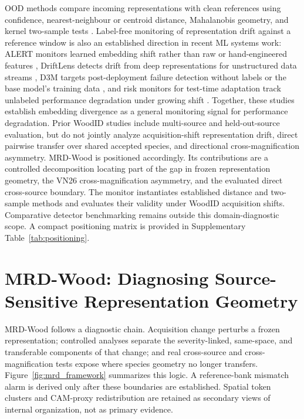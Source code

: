 \documentclass[a4paper,fleqn]{els-cas-templates/cas-sc}
\begin{document}
OOD methods compare incoming representations with clean references using
confidence, nearest-neighbour or centroid distance, Mahalanobis geometry, and
kernel two-sample tests
\citep{hendrycks2017baseline,lee2018mahalanobis,sun2022knn,gretton2012mmd}.
Label-free monitoring of representation drift against a reference window is
also an established direction in recent ML systems work: ALERT monitors learned
embedding shift rather than raw or hand-engineered features
\citep{tziouvaras2025alert}, DriftLens detects drift from deep representations
for unstructured data streams \citep{greco2024driftlens}, D3M targets
post-deployment failure detection without labels or the base model's training
data \citep{nguyen2025d3m}, and risk monitors for test-time adaptation track
unlabeled performance degradation under growing shift
\citep{schirmer2025monitoring}. Together, these studies establish embedding
divergence as a general monitoring signal for performance degradation.
Prior WoodID studies include multi-source and held-out-source evaluation, but do
not jointly analyze acquisition-shift representation drift, direct pairwise
transfer over shared accepted species, and directional cross-magnification
asymmetry. MRD-Wood is positioned accordingly. Its contributions are a
controlled decomposition locating part of the gap in frozen representation
geometry, the VN26 cross-magnification asymmetry, and the evaluated direct
cross-source boundary. The monitor instantiates
established distance and two-sample methods and evaluates their validity under
WoodID acquisition shifts. Comparative detector benchmarking remains outside
this domain-diagnostic scope.
A compact positioning matrix is provided in Supplementary
Table~\ref{tab:positioning}.

\section{MRD-Wood: Diagnosing Source-Sensitive Representation Geometry}

MRD-Wood follows a diagnostic chain. Acquisition change perturbs a frozen
representation; controlled analyses separate
the severity-linked, same-space, and transferable components of that change; and
real cross-source and cross-magnification tests expose where species geometry no
longer transfers. Figure~\ref{fig:mrd_framework} summarizes this logic. A
reference-bank mismatch alarm is derived only after these boundaries are
established. Spatial token clusters and CAM-proxy redistribution are retained as
secondary views of internal organization, not as primary evidence.
\end{document}
